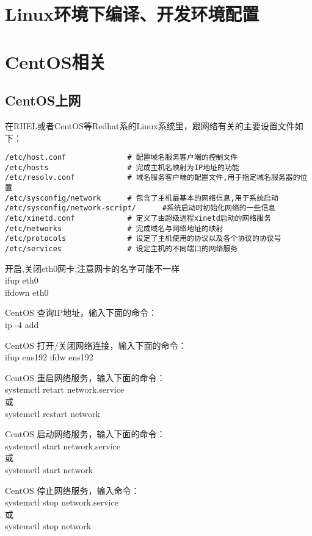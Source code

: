 \chapter{Linux环境下编译、开发环境配置}


\chapter{CentOS相关}
\section{CentOS上网}
在RHEL或者CentOS等Redhat系的Linux系统里，跟网络有关的主要设置文件如下：
\begin{verbatim}
/etc/host.conf              # 配置域名服务客户端的控制文件
/etc/hosts                  # 完成主机名映射为IP地址的功能
/etc/resolv.conf            # 域名服务客户端的配置文件,用于指定域名服务器的位置
/etc/sysconfig/network      # 包含了主机最基本的网络信息,用于系统启动
/etc/sysconfig/network-script/      #系统启动时初始化网络的一些信息
/etc/xinetd.conf            # 定义了由超级进程xinetd启动的网络服务
/etc/networks               # 完成域名与网络地址的映射
/etc/protocols              # 设定了主机使用的协议以及各个协议的协议号
/etc/services               # 设定主机的不同端口的网络服务
\end{verbatim}



开启,关闭eth0网卡,注意网卡的名字可能不一样\\
ifup    eth0\\
ifdown  eth0


CentOS 查询IP地址，输入下面的命令：\\
ip -4 add


CentOS 打开/关闭网络连接，输入下面的命令：\\
ifup ens192 ifdw ens192


CentOS 重启网络服务，输入下面的命令：\\
systemctl retart network.service\\
或\\
systemctl restart network


CentOS  启动网络服务，输入下面的命令：\\
systemctl start network.service\\
或\\
systemctl start network


CentOS  停止网络服务，输入命令：\\
systemctl stop network.service\\
或\\
systemctl stop network

